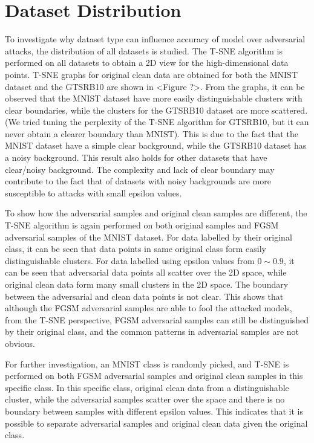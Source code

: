 \documentclass{article}
\begin{document}
\section{Dataset Distribution}
To investigate why dataset type can influence accuracy of model over adversarial attacks, the distribution of all datasets is studied.
The T-SNE algorithm is performed on all datasets to obtain a 2D view for the high-dimensional data points.
T-SNE graphs for original clean data are obtained for both the MNIST dataset and the GTSRB10 are shown in <Figure ?>.
From the graphs, it can be observed that the MNIST dataset have more easily distinguishable clusters with clear boundaries, while the clusters for the GTSRB10 dataset are more scattered.
(We tried tuning the perplexity of the T-SNE algorithm for GTSRB10, but it can never obtain a clearer boundary than MNIST).
This is due to the fact that the MNIST dataset have a simple clear background, while the GTSRB10 dataset has a noisy background.
This result also holds for other datasets that have clear/noisy background.
The complexity and lack of clear boundary may contribute to the fact that of datasets with noisy backgrounds are more susceptible to attacks with small epsilon values.

To show how the adversarial samples and original clean samples are different, the T-SNE algorithm is again performed on both original samples and FGSM adversarial samples of the MNIST dataset.
For data labelled by their original class, it can be seen that data points in same original class form easily distinguishable clusters.
For data labelled using epsilon values from $0 \sim 0.9$, it can be seen that adversarial data points all scatter over the 2D space, while original clean data form many small clusters in the 2D space.
The boundary between the adversarial and clean data points is not clear. This shows that although the FGSM adversarial samples are able to fool the attacked models,
from the T-SNE perspective, FGSM adversarial samples can still be distinguished by their original class, and the common patterns in adversarial samples are not obvious.

For further investigation, an MNIST class is randomly picked, and T-SNE is performed on both FGSM adversarial samples and original clean samples in this specific class.
In this specific class, original clean data from a distinguishable cluster, while the adversarial samples scatter over the space and there is no boundary between samples with different epsilon values.
This indicates that it is possible to separate adversarial samples and original clean data given the original class.
\end{document}

